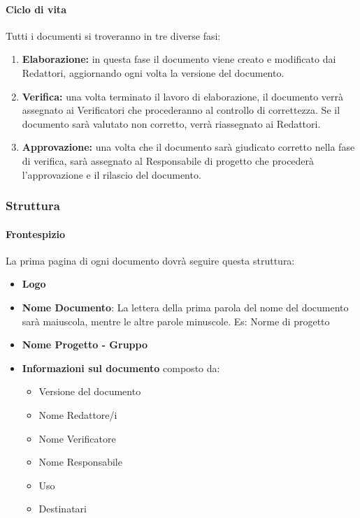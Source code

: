 \documentclass[11pt,a4paper]{article}
\begin{document}
{\begin{itemize}
	\end{itemize}
	
	\paragraph{Ciclo di vita\\}
	Tutti i documenti si troveranno in tre diverse fasi:
	\begin{enumerate}
		\item \textbf{Elaborazione:} in questa fase il documento viene creato e modificato dai Redattori, aggiornando ogni volta la versione del documento. 
		\item \textbf{Verifica:} una volta terminato il lavoro di elaborazione, il documento verrà assegnato ai Verificatori che procederanno al controllo di correttezza. Se il documento sarà valutato non corretto, verrà riassegnato ai Redattori.
		\item \textbf{Approvazione:} una volta che il documento sarà giudicato corretto nella fase di verifica, sarà assegnato al Responsabile di progetto che procederà l'approvazione e il rilascio del documento.
	\end{enumerate}
	
	\subsubsection{Struttura}
	
	\paragraph{Frontespizio} 
	La prima pagina di ogni documento dovrà seguire questa struttura:
	\begin{itemize}
		\item \textbf{Logo}
		\item \textbf{Nome Documento}: La lettera della prima parola del nome del documento sarà maiuscola, mentre le altre parole minuscole. Es: Norme di progetto
		\item \textbf{Nome Progetto - Gruppo}
		\item \textbf{Informazioni sul documento} composto da:
		\begin{itemize}
			\item  Versione del documento 
			\item Nome Redattore/i
			\item Nome Verificatore
			\item  Nome Responsabile
			\item  Uso
			\item Destinatari
		\end{itemize}
	\end{itemize}
	
}
\end{document}
